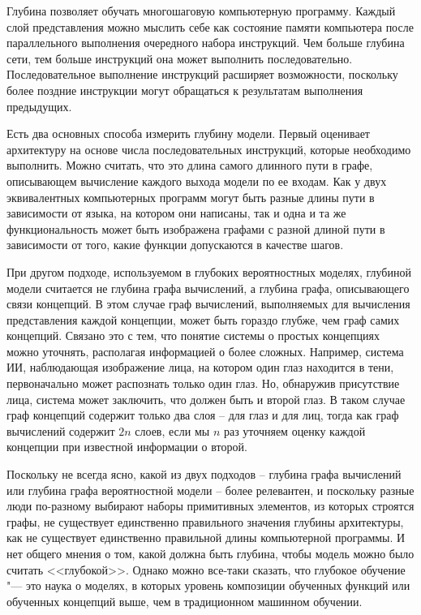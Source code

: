 \documentclass[bachelor, och, coursework]{SCWorks}
\begin{document}
        Глубина позволяет обучать многошаговую компьютерную программу. Каждый 
        слой представления можно мыслить себе как состояние памяти компьютера 
        после параллельного выполнения очередного набора инструкций. Чем больше 
        глубина сети, тем больше инструкций она может выполнить последовательно. 
        Последовательное выполнение инструкций расширяет возможности, поскольку 
        более поздние инструкции могут обращаться к результатам выполнения предыдущих.
        
        Есть два основных способа измерить глубину модели. Первый оценивает 
        архитектуру на основе числа последовательных инструкций, которые необходимо 
        выполнить. Можно считать, что это длина самого длинного пути в графе, 
        описывающем вычисление каждого выхода модели по ее входам. Как у двух 
        эквивалентных компьютерных программ могут быть разные длины пути в зависимости 
        от языка, на котором они написаны, так и одна и та же функциональность 
        может быть изображена графами с разной длиной пути в зависимости от того, 
        какие функции допускаются в качестве шагов. 

        При другом подходе, используемом в глубоких вероятностных моделях, глубиной
        модели считается не глубина графа вычислений, а глубина графа, описывающего
        связи концепций. В этом случае граф вычислений, выполняемых для вычисления
        представления каждой концепции, может быть гораздо глубже, чем граф самих 
        концепций. Связано это с тем, что понятие системы о простых концепциях можно 
        уточнять, располагая информацией о более сложных. Например, система ИИ, 
        наблюдающая изображение лица, на котором один глаз находится в тени, первоначально
        может распознать только один глаз. Но, обнаружив присутствие лица, система 
        может заключить, что должен быть и второй глаз. В таком случае граф концепций 
        содержит только два слоя – для глаз и для лиц, тогда как граф вычислений 
        содержит $2n$ слоев, если мы $n$ раз уточняем оценку каждой концепции при 
        известной информации о второй.

        Поскольку не всегда ясно, какой из двух подходов – глубина графа вычислений
        или глубина графа вероятностной модели – более релевантен, и поскольку разные 
        люди по-разному выбирают наборы примитивных элементов, из которых строятся
        графы, не существует единственно правильного значения глубины архитектуры, 
        как не существует единственно правильной длины компьютерной программы. И 
        нет общего мнения о том, какой должна быть глубина, чтобы модель можно было 
        считать <<глубокой>>. Однако можно все-таки сказать, что глубокое обучение 
        "--- это наука о моделях, в которых уровень композиции обученных функций 
        или обученных концепций выше, чем в традиционном машинном обучении.
\end{document}
